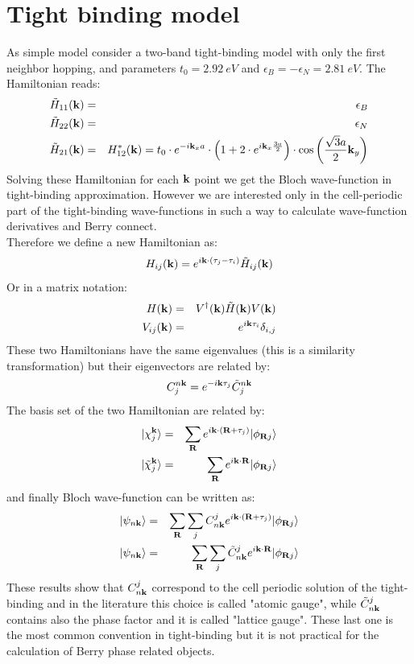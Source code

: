 \documentclass[preprint,showpacs,prb,superscriptaddress,aps,floatfix]{revtex4-1}
\newcommand{\RR}{{\bf R}}
\newcommand{\kk}{{\bf k}}
\newcommand{\be}{\begin{equation}}
\newcommand{\ee}{\end{equation}}
\newcommand{\bea}{\begin{eqnarray}}
\newcommand{\eea}{\end{eqnarray}}
\renewcommand{\[}{\left[}
\renewcommand{\]}{\right]}
\renewcommand{\(}{\left(}
\renewcommand{\)}{\right)}
\begin{document}
\section{Tight binding model}
As simple model consider a two-band tight-binding model with only the first neighbor hopping, and parameters $t_0=2.92~eV$ and $\epsilon_B = -\epsilon_N = 2.81~eV$. The Hamiltonian reads:
\bea
\tilde H_{11}(\kk)&=&\epsilon_B\\
\tilde H_{22}(\kk)&=&\epsilon_N\\
\tilde H_{21}(\kk)&=&H^*_{12}(\kk) = t_0 \cdot e^{-i \kk_x a}\cdot \left(1+2 \cdot e^{i \kk_x \frac{3 a}{2}} \right)\cdot \cos{ \left( \frac{\sqrt{3} a}{2}\kk_y \right) }
\eea 
Solving these Hamiltonian for each $\kk$ point we get the Bloch wave-function in tight-binding approximation. However we are interested only in the cell-periodic part of the tight-binding wave-functions in such a way to calculate wave-function derivatives and Berry connect.\cite{PythTB} \\
Therefore we define a new Hamiltonian as:
\be
H_{ij}(\kk)=e^{i \kk \cdot (\tau_j -\tau_i) } \tilde H_{ij}(\kk) 
\ee
Or in a matrix notation:
\bea
H(\kk)&=&V^\dagger(\kk) \tilde H(\kk) V(\kk) \\
V_{ij}(\kk)&=& e^{i\kk \tau_i} \delta_{i,j}
\eea
These two Hamiltonians have the same eigenvalues (this is a similarity transformation) but their eigenvectors are related by:
\be
 C_j^{n \kk} = e^{-i \kk \tau_j} \tilde C_j^{n \kk}
\ee
The basis set of the two Hamiltonian are related by:
\bea
|\chi_j^\kk \rangle &=& \sum_\RR e^{i \kk \cdot (\RR + \tau_j)} | \phi_{\RR j} \rangle  \\
|\tilde \chi_j^\kk \rangle &=& \sum_\RR e^{i \kk \cdot \RR } | \phi_{\RR j} \rangle  \\
\eea
and finally Bloch wave-function can be written as:
\bea
|\psi_{n \kk} \rangle &=& \sum_{\RR} \sum_j C_{n \kk}^j e^{i\kk \cdot (\RR + \tau_j) }  | \phi_{\RR j} \rangle \\
|\psi_{n \kk} \rangle &=& \sum_{\RR} \sum_j \tilde C_{n \kk}^j e^{i\kk \cdot \RR  }  | \phi_{\RR j} \rangle
\eea
These results show that $ C_{n \kk}^j$ correspond to the cell periodic solution of the tight-binding and in the literature this choice is called "atomic gauge", while $\tilde C_{n \kk}^j $ contains also the phase factor and it is called "lattice gauge".\cite{wanniertools} These last one is the most common convention in tight-binding but it is not practical for the calculation of Berry phase related objects.
\end{document}
